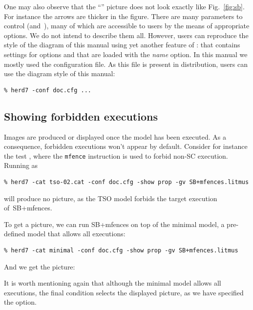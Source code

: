 One may also observe that the ``''  picture does not
look exactly like Fig.~\ref{fig:sb}. For instance the
 arrows are thicker in the figure.
There are many parameters to control  (and~),
many of which are accessible to \herd{} users by the means of appropriate
options. We do not intend to describe them all.
However, users can reproduce the style of the diagram of this manual using
yet another feature of \herd: 
that contains settings for \herd{} options and that are loaded with the
\textit{name} option.
In this manual we mostly used the  configuration file.
As this file is present in \herd{} distribution, users
can use the diagram style of this manual:
\begin{verbatim}
% herd7 -conf doc.cfg ...
\end{verbatim}

\subsection{\label{show:forbidden}Showing forbidden executions}
Images are produced or displayed once the model has been executed.
As a consequence,
forbidden executions won't appear by default.
Consider for instance the test ,
where the \texttt{mfence} instruction is used to forbid
 non-SC execution. Running \herd{} as
\begin{verbatim}
% herd7 -cat tso-02.cat -conf doc.cfg -show prop -gv SB+mfences.litmus
\end{verbatim}
will produce no picture, as the TSO model forbids the target execution
of~\textsf{SB+mfences}.

To get a picture, we can run \textsf{SB+mfences} on top of the minimal
model, a pre-defined model that allows all executions:
\begin{verbatim}
% herd7 -cat minimal -conf doc.cfg -show prop -gv SB+mfences.litmus
\end{verbatim}
And we get the picture:
\begin{center}\end{center}
It is worth mentioning again  that although the minimal model allows all
executions, the final condition
selects the displayed picture, as we have specified the
 option.


